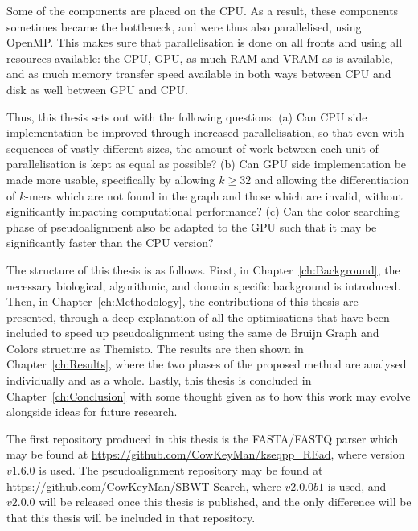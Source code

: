 Some of the components are placed on the CPU.
As a result, these components sometimes became the bottleneck, and were thus also parallelised, using OpenMP.
This makes sure that parallelisation is done on all fronts and using all resources available: the CPU, GPU, as much RAM and VRAM as is available, and as much memory transfer speed available in both ways between CPU and disk as well between GPU and CPU.

Thus, this thesis sets out with the following questions:
(a) Can CPU side implementation be improved through increased parallelisation, so that even with sequences of vastly different sizes, the amount of work between each unit of parallelisation is kept as equal as possible?
(b) Can GPU side implementation be made more usable, specifically by allowing $k \ge 32$ and allowing the differentiation of $k$-mers which are not found in the graph and those which are invalid, without significantly impacting computational performance?
(c) Can the color searching phase of pseudoalignment also be adapted to the GPU such that it may be significantly faster than the CPU version?

The structure of this thesis is as follows.
First, in Chapter~\ref{ch:Background}, the necessary biological, algorithmic, and domain specific background is introduced.
Then, in Chapter~\ref{ch:Methodology}, the contributions of this thesis are presented, through a deep explanation of all the optimisations that have been included to speed up pseudoalignment using the same de Bruijn Graph and Colors structure as Themisto.
The results are then shown in Chapter~\ref{ch:Results}, where the two phases of the proposed method are analysed individually and as a whole.
Lastly, this thesis is concluded in Chapter~\ref{ch:Conclusion} with some thought given as to how this work may evolve alongside ideas for future research.

The first repository produced in this thesis is the FASTA/FASTQ parser which may be found at \url{https://github.com/CowKeyMan/kseqpp_REad}, where version $\mathit{v1.6.0}$ is used.
The pseudoalignment repository may be found at \url{https://github.com/CowKeyMan/SBWT-Search}, where $\mathit{v2.0.0b1}$ is used, and $\mathit{v2.0.0}$ will be released once this thesis is published, and the only difference will be that this thesis will be included in that repository.
